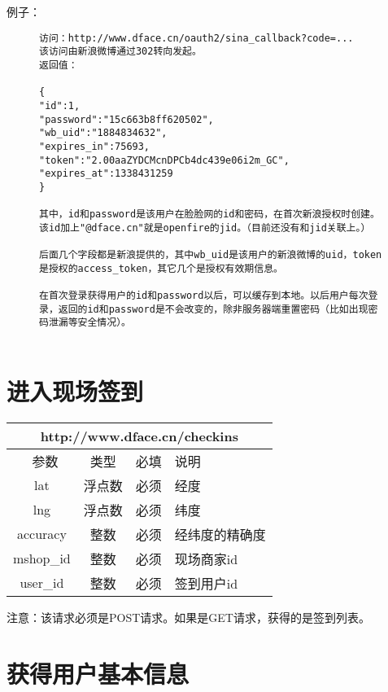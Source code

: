 \documentclass[cs4size]{ctexartutf8}
\begin{document}
例子：

\begin{figure}[H]
\begin{verbatim}
访问：http://www.dface.cn/oauth2/sina_callback?code=...
该访问由新浪微博通过302转向发起。
返回值：

{
"id":1,
"password":"15c663b8ff620502",
"wb_uid":"1884834632",
"expires_in":75693,
"token":"2.00aaZYDCMcnDPCb4dc439e06i2m_GC",
"expires_at":1338431259
}

其中，id和password是该用户在脸脸网的id和密码，在首次新浪授权时创建。该id加上"@dface.cn"就是openfire的jid。（目前还没有和jid关联上。）

后面几个字段都是新浪提供的，其中wb_uid是该用户的新浪微博的uid，token是授权的access_token，其它几个是授权有效期信息。

在首次登录获得用户的id和password以后，可以缓存到本地。以后用户每次登录，返回的id和password是不会改变的，除非服务器端重置密码（比如出现密码泄漏等安全情况）。


\end{verbatim}
\end{figure}


\section{进入现场签到}

\begin{table}[H]
   \begin{center}
\begin{tabular}{|c|c|c|p{12cm}|}
\hline
\multicolumn{4}{|c|}{http://www.dface.cn/checkins} \\
\hline\hline
 \  参数  & 类型 & 必填 &  说明  \\
\hline
 lat  & 浮点数 & 必须 & 经度\\
\hline
 lng  &  浮点数 & 必须 & 纬度\\ 
\hline
 accuracy  & 整数 & 必须 & 经纬度的精确度\\ 
\hline
 mshop\_id  & 整数 & 必须 &  现场商家id\\ 
\hline
 user\_id  & 整数 & 必须 &  签到用户id\\ 
\hline
\end{tabular}
   \end{center}
\end{table}

注意：该请求必须是POST请求。如果是GET请求，获得的是签到列表。



\section{获得用户基本信息}
\end{document}
